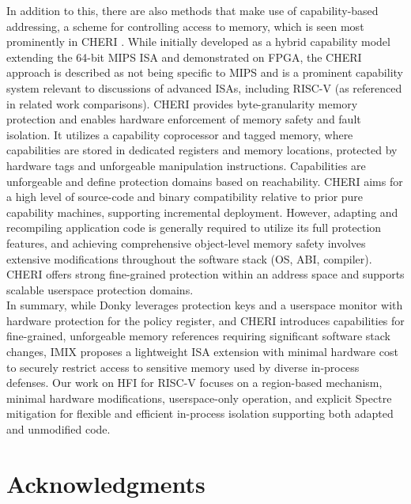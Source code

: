 \documentclass[conference,compsoc]{IEEEtran}
\begin{document}
In addition to this, there are also methods that make use of capability-based addressing, a scheme for controlling access to memory, which is seen most prominently in CHERI \cite{CHERI}. While initially developed as a hybrid capability model extending the 64-bit MIPS ISA and demonstrated on FPGA, the CHERI approach is described as not being specific to MIPS and is a prominent capability system relevant to discussions of advanced ISAs, including RISC-V (as referenced in related work comparisons). CHERI provides byte-granularity memory protection and enables hardware enforcement of memory safety and fault isolation. It utilizes a capability coprocessor and tagged memory, where capabilities are stored in dedicated registers and memory locations, protected by hardware tags and unforgeable manipulation instructions. Capabilities are unforgeable and define protection domains based on reachability. CHERI aims for a high level of source-code and binary compatibility relative to prior pure capability machines, supporting incremental deployment. However, adapting and recompiling application code is generally required to utilize its full protection features, and achieving comprehensive object-level memory safety involves extensive modifications throughout the software stack (OS, ABI, compiler). CHERI offers strong fine-grained protection within an address space and supports scalable userspace protection domains.\\
In summary, while Donky leverages protection keys and a userspace monitor with hardware protection for the policy register, and CHERI introduces capabilities for fine-grained, unforgeable memory references requiring significant software stack changes, IMIX proposes a lightweight ISA extension with minimal hardware cost to securely restrict access to sensitive memory used by diverse in-process defenses. Our work on HFI for RISC-V focuses on a region-based mechanism, minimal hardware modifications, userspace-only operation, and explicit Spectre mitigation for flexible and efficient in-process isolation supporting both adapted and unmodified code.





\ifCLASSOPTIONcompsoc
  \section*{Acknowledgments}
\else
\end{document}
